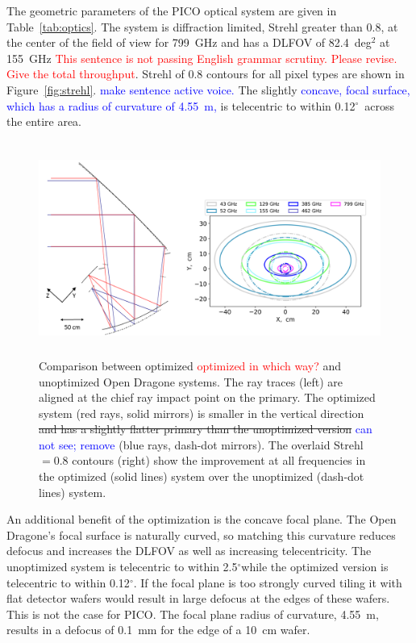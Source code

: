 \documentclass[]{spie}  %
\newcommand{\comr}[1]{\textcolor{red}{#1}}
\newcommand{\comb}[1]{\textcolor{blue}{#1}}
\newcommand{\dgr}{$^\circ$}
\begin{document}
The geometric parameters of the PICO optical system are given in Table~\ref{tab:optics}. The 
system is diffraction limited, Strehl greater than 0.8, at the center of the field of view for 799~GHz and has a 
DLFOV of 82.4~deg$^2$ at 155~GHz \comr{This sentence is not passing English grammar scrutiny. 
Please revise. Give the total throughput}.  Strehl of 0.8 contours for all pixel types are shown in Figure~\ref{fig:strehl}. 
\comb{make sentence active voice.} 
The slightly \comb{concave, focal surface, which has a radius of curvature of 4.55~m,} is telecentric to 
within 0.12\dgr\ across the entire area.

\begin{figure} [ht]
\begin{center}
\includegraphics[height=7cm]{jpl_vs_V3D.png}
\end{center}
\caption { \label{fig:compare} 
Comparison between optimized \comr{optimized in which way?} and unoptimized Open Dragone systems.  
The ray traces (left) are aligned at the chief ray impact point on the primary. 
The optimized system (red rays, solid mirrors) is smaller in the vertical direction \sout{and has a 
slightly flatter primary than the unoptimized version} \comb{can not see; remove} 
(blue rays, dash-dot mirrors). The overlaid Strehl~$=0.8$ contours (right) show the improvement at 
all frequencies in the optimized (solid lines) system over the unoptimized (dash-dot lines) system. 
}
\end{figure} 

An additional benefit of the optimization is the concave focal plane. The Open Dragone's focal surface is naturally curved, so matching this 
curvature reduces defocus and increases the DLFOV as well as increasing telecentricity.  The unoptimized system is telecentric to within 
2.5\dgr while the optimized version is telecentric to within 0.12\dgr. If the focal plane is too strongly curved tiling it with flat detector 
wafers would result in large defocus at the edges of these wafers.  This is not the case for PICO. The focal plane radius of curvature, 4.55~m, 
results in a defocus of 0.1~mm for the edge of a 10~cm wafer. 
\end{document}
